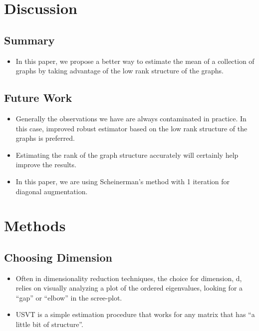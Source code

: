 \documentclass[a4paper]{article}
\begin{document}
\section{Discussion}

\subsection{Summary}
\begin{itemize}
\item In this paper, we propose a better way to estimate the mean of a collection of graphs by taking advantage of the low rank structure of the graphs.
\end{itemize}

\subsection{Future Work}
\begin{itemize}
\item Generally the observations we have are always contaminated in practice. In this case, improved robust estimator based on the low rank structure of the graphs is preferred.
\item Estimating the rank of the graph structure accurately will certainly help improve the results.
\item In this paper, we are using Scheinerman's method with 1 iteration for diagonal augmentation.
\end{itemize}






\section{Methods}

\subsection{Choosing Dimension}
\label{section:dim_select}
\begin{itemize}
\item Often in dimensionality reduction techniques, the choice for dimension, d, relies on visually analyzing a plot of the ordered eigenvalues, looking for a ``gap'' or ``elbow'' in the scree-plot.
\item USVT is a simple estimation procedure that works for any matrix that has ``a little bit of structure''.
\end{itemize}
\end{document}
